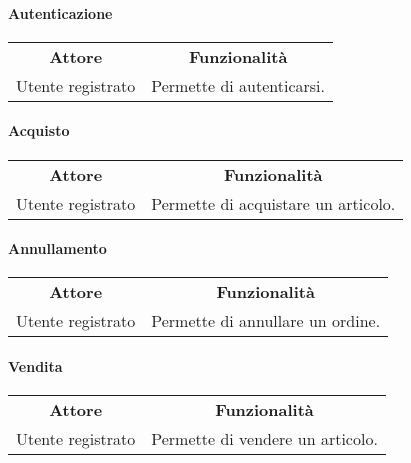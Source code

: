 \documentclass[12pt,a4paper]{article}
\begin{document}
\paragraph*{Autenticazione}
\begin{center}
\begin{tabular}{|c|c|}
\rowcolor[gray]{0.8}
\hline
\textbf{Attore} & \textbf{Funzionalità} \\
Utente registrato & Permette di autenticarsi. \\
\hline
\end{tabular}
\end{center}

\paragraph*{Acquisto}
\begin{center}
\begin{tabular}{|c|c|}
\rowcolor[gray]{0.8}
\hline
\textbf{Attore} & \textbf{Funzionalità} \\
Utente registrato & Permette di acquistare un articolo. \\
\hline
\end{tabular}
\end{center}

\paragraph*{Annullamento}
\begin{center}
\begin{tabular}{|c|c|}
\rowcolor[gray]{0.8}
\hline
\textbf{Attore} & \textbf{Funzionalità} \\
Utente registrato & Permette di annullare un ordine. \\
\hline
\end{tabular}
\end{center}

\paragraph*{Vendita}
\begin{center}
\begin{tabular}{|c|c|}
\rowcolor[gray]{0.8}
\hline
\textbf{Attore} & \textbf{Funzionalità} \\
Utente registrato & Permette di vendere un articolo. \\
\hline
\end{tabular}
\end{center}
\end{document}
